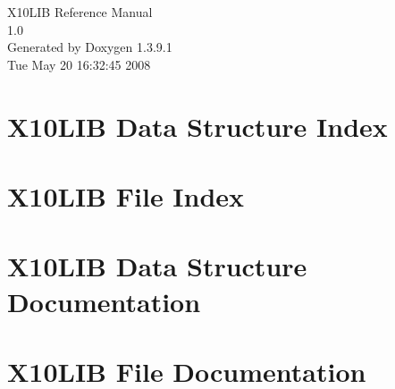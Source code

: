 \documentclass[a4paper]{book}
\begin{document}
\begin{titlepage}
\vspace*{7cm}
\begin{center}
{\Large X10LIB Reference Manual\\[1ex]\large 1.0 }\\
\vspace*{1cm}
{\large Generated by Doxygen 1.3.9.1}\\
\vspace*{0.5cm}
{\small Tue May 20 16:32:45 2008}\\
\end{center}
\end{titlepage}
\clearemptydoublepage
{}
\tableofcontents
\clearemptydoublepage
{}
\chapter{X10LIB Data Structure Index}

\chapter{X10LIB File Index}

\chapter{X10LIB Data Structure Documentation}













\chapter{X10LIB File Documentation}








\printindex
\end{document}
